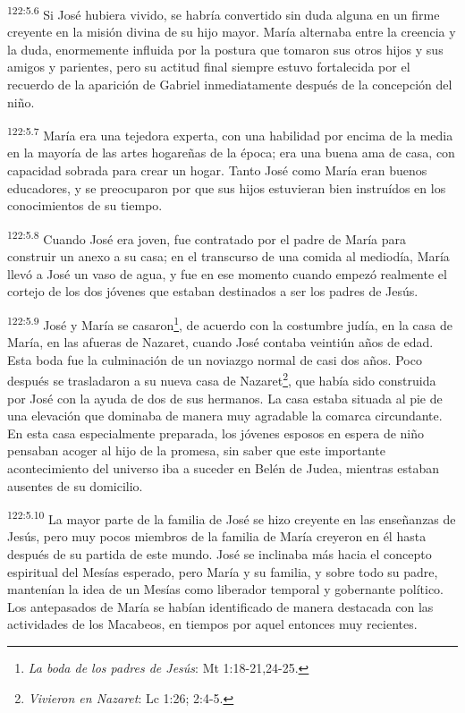 \par 
\textsuperscript{122:5.6} Si José hubiera vivido, se habría convertido sin duda alguna en un firme creyente en la misión divina de su hijo mayor. María alternaba entre la creencia y la duda, enormemente influida por la postura que tomaron sus otros hijos y sus amigos y parientes, pero su actitud final siempre estuvo fortalecida por el recuerdo de la aparición de Gabriel inmediatamente después de la concepción del niño.

\par 
\textsuperscript{122:5.7} María era una tejedora experta, con una habilidad por encima de la media en la mayoría de las artes hogareñas de la época; era una buena ama de casa, con capacidad sobrada para crear un hogar. Tanto José como María eran buenos educadores, y se preocuparon por que sus hijos estuvieran bien instruídos en los conocimientos de su tiempo.

\par 
\textsuperscript{122:5.8} Cuando José era joven, fue contratado por el padre de María para construir un anexo a su casa; en el transcurso de una comida al mediodía, María llevó a José un vaso de agua, y fue en ese momento cuando empezó realmente el cortejo de los dos jóvenes que estaban destinados a ser los padres de Jesús.

\par 
\textsuperscript{122:5.9} José y María se casaron\footnote{\textit{La boda de los padres de Jesús}: Mt 1:18-21,24-25.}, de acuerdo con la costumbre judía, en la casa de María, en las afueras de Nazaret, cuando José contaba veintiún años de edad. Esta boda fue la culminación de un noviazgo normal de casi dos años. Poco después se trasladaron a su nueva casa de Nazaret\footnote{\textit{Vivieron en Nazaret}: Lc 1:26; 2:4-5.}, que había sido construida por José con la ayuda de dos de sus hermanos. La casa estaba situada al pie de una elevación que dominaba de manera muy agradable la comarca circundante. En esta casa especialmente preparada, los jóvenes esposos en espera de niño pensaban acoger al hijo de la promesa, sin saber que este importante acontecimiento del universo iba a suceder en Belén de Judea, mientras estaban ausentes de su domicilio.

\par 
\textsuperscript{122:5.10} La mayor parte de la familia de José se hizo creyente en las enseñanzas de Jesús, pero muy pocos miembros de la familia de María creyeron en él hasta después de su partida de este mundo. José se inclinaba más hacia el concepto espiritual del Mesías esperado, pero María y su familia, y sobre todo su padre, mantenían la idea de un Mesías como liberador temporal y gobernante político. Los antepasados de María se habían identificado de manera destacada con las actividades de los Macabeos, en tiempos por aquel entonces muy recientes.

